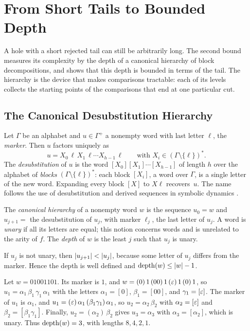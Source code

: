 \section{From Short Tails to Bounded Depth}
\label{sec:depth}

A hole with a short rejected tail can still be arbitrarily long. The second bound
measures its complexity by the depth of a canonical hierarchy of block decompositions, and
shows that this depth is bounded in terms of the tail. The hierarchy is the device that
makes comparisons tractable: each of its levels collects the starting points of the
comparisons that end at one particular cut.

\subsection{The Canonical Desubstitution Hierarchy}

Let $\Gamma$ be an alphabet and $u \in \Gamma^+$ a nonempty word with last letter $\ell$,
the \emph{marker}. Then $u$ factors uniquely as
\[
  u = X_0\,\ell\,X_1\,\ell \cdots X_{h-1}\,\ell \qquad\text{with } X_i \in (\Gamma\setminus\{\ell\})^*.
\]
The \emph{desubstitution} of $u$ is the word $[X_0][X_1]\cdots[X_{h-1}]$ of length $h$
over the alphabet of \emph{blocks} $(\Gamma\setminus\{\ell\})^*$: each block $[X_i]$, a word
over $\Gamma$, is a single letter of the new word. Expanding every block $[X]$ to $X\ell$
recovers~$u$. The
name follows the use of desubstitution and derived sequences in symbolic dynamics
\citep{Durand98}.

\begin{definition}\label{def:hierarchy}
The \emph{canonical hierarchy} of a nonempty word $w$ is the sequence $u_0 = w$ and
$u_{j+1} = $ the desubstitution of $u_j$, with marker $\ell_j$, the last letter of $u_j$. A
word is \emph{unary} if all its letters are equal; this notion concerns words and is
unrelated to the arity of $f$. The \emph{depth} of $w$ is the least $j$
such that $u_j$ is unary.
\end{definition}

If $u_j$ is not unary, then $\lvert u_{j+1}\rvert < \lvert u_j\rvert$, because some letter of $u_j$ differs
from the marker. Hence the depth is well defined and $\operatorname{depth}(w) \le \lvert w\rvert - 1$.

\begin{example}\label{ex:hierarchy}
Let $w = 01001101$. Its marker is $1$, and $w = (0)\,1\,(00)\,1\,(\varepsilon)\,1\,(0)\,1$, so
$u_1 = \alpha_1\,\beta_1\,\gamma_1\,\alpha_1$ with the letters $\alpha_1 = [0]$, $\beta_1 = [00]$, and $\gamma_1 = [\varepsilon]$. The marker of
$u_1$ is $\alpha_1$, and $u_1 = (\varepsilon)\,\alpha_1\,(\beta_1\gamma_1)\,\alpha_1$, so $u_2 = \alpha_2\,\beta_2$ with $\alpha_2 = [\varepsilon]$ and $\beta_2 = [\beta_1\gamma_1]$.
Finally, $u_2 = (\alpha_2)\,\beta_2$ gives $u_3 = \alpha_3$ with $\alpha_3 = [\alpha_2]$, which is unary. Thus
$\operatorname{depth}(w) = 3$, with lengths $8,4,2,1$.
\end{example}

